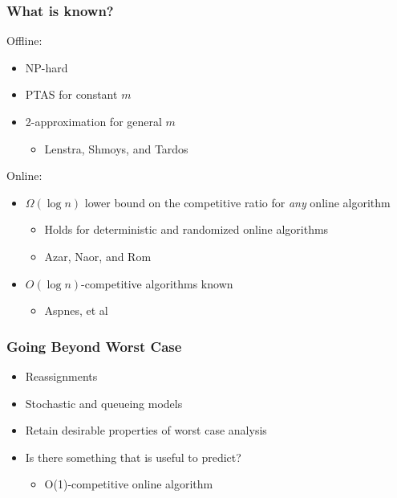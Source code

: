 \documentclass{beamer}
\begin{document}
\begin{frame}

\frametitle{What is known?}

Offline:
\begin{itemize}
\item NP-hard
\item PTAS for constant $m$
\item 2-approximation for general $m$
\begin{itemize}
\item Lenstra, Shmoys, and Tardos
\end{itemize}
\end{itemize}
\pause
Online:
\begin{itemize}
\item $\Omega(\log n)$ lower bound on the competitive ratio for \emph{any} online algorithm

	\begin{itemize}
	\item Holds for deterministic and randomized online algorithms
	\item Azar, Naor, and Rom
	\end{itemize}
\item $O(\log n)$-competitive algorithms known
\begin{itemize}
\item Aspnes, et al
\end{itemize}
\end{itemize}

\end{frame}

\begin{frame}
\frametitle{Going Beyond Worst Case}
\begin{itemize}
\item Reassignments
\item Stochastic and queueing models
\item Retain desirable properties of worst case analysis
\item Is there something that is useful to predict?
\begin{itemize}
\item O(1)-competitive online algorithm
\end{itemize}
\end{itemize}

\end{frame}
\end{document}
